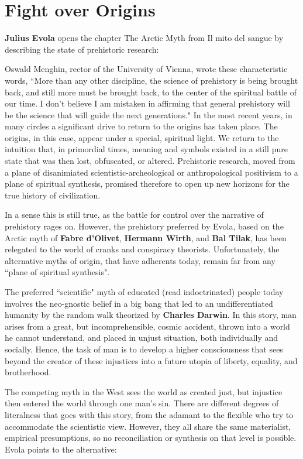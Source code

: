 \section{Fight over Origins}

\textbf{Julius Evola} opens the chapter The Arctic Myth from Il mito del sangue by describing the state of prehistoric research:

\begin{quotex}
Oswald Menghin, rector of the University of Vienna, wrote these characteristic words, ``More than any other discipline, the science of prehistory is being brought back, and still more must be brought back, to the center of the spiritual battle of our time. I don't believe I am mistaken in affirming that general prehistory will be the science that will guide the next generations." In the most recent years, in many circles a significant drive to return to the origins has taken place. The origins, in this case, appear under a special, spiritual light. We return to the intuition that, in primordial times, meaning and symbols existed in a still pure state that was then lost, obfuscated, or altered. Prehistoric research, moved from a plane of disanimiated scientistic-archeological or anthropological positivism to a plane of spiritual synthesis, promised therefore to open up new horizons for the true history of civilization. 

\end{quotex}
In a sense this is still true, as the battle for control over the narrative of prehistory rages on. However, the prehistory preferred by Evola, based on the Arctic myth of \textbf{Fabre d'Olivet}, \textbf{Hermann Wirth}, and \textbf{Bal Tilak}, has been relegated to the world of cranks and conspiracy theorists. Unfortunately, the alternative myths of origin, that have adherents today, remain far from any ``plane of spiritual synthesis".

The preferred ``scientific" myth of educated (read indoctrinated) people today involves the neo-gnostic belief in a big bang that led to an undifferentiated humanity by the random walk theorized by \textbf{Charles Darwin}. In this story, man arises from a great, but incomprehensible, cosmic accident, thrown into a world he cannot understand, and placed in unjust situation, both individually and socially. Hence, the task of man is to develop a higher consciousness that sees beyond the creator of these injustices into a future utopia of liberty, equality, and brotherhood.

The competing myth in the West sees the world as created just, but injustice then entered the world through one man's sin. There are different degrees of literalness that goes with this story, from the adamant to the flexible who try to accommodate the scientistic view. However, they all share the same materialist, empirical presumptions, so no reconciliation or synthesis on that level is possible. Evola points to the alternative:

